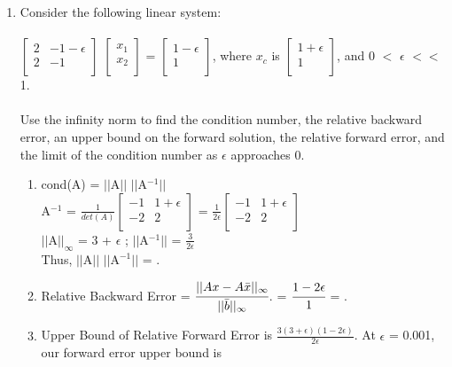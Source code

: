 \documentclass[12pt]{article}
\begin{document}
\begin{enumerate}
\pagebreak
\item Consider the following linear system: \\ \\
$\begin{bmatrix}
    2 & -1-\epsilon\\
   2 & -1 \\
\end{bmatrix}$ $\begin{bmatrix}
   x_1 \\
   x_2 \\
\end{bmatrix}$ = $\begin{bmatrix}
   1-\epsilon \\
   1 \\
\end{bmatrix}$, where $x_c$ is $\begin{bmatrix}
   1+\epsilon \\
   1 \\
\end{bmatrix}$, and 0 $<$ $\epsilon$ $<<$ 1. \\ \\
Use the infinity norm to find the condition number, the relative backward error, an upper bound on the forward solution, the relative forward error, and the limit of the condition number as $\epsilon$ approaches 0.
	\begin{enumerate}
		\item cond(A) = $||$A$||$ $||$A$^{-1}||$ \\
		A$^{-1}$ = $\frac{1}{det(A)} \begin{bmatrix}
    -1 & 1+\epsilon\\
   -2 & 2 \\
\end{bmatrix}$ =  $\frac{1}{2\epsilon} \begin{bmatrix}
    -1 & 1+\epsilon\\
   -2 & 2 \\
\end{bmatrix}$ \\
$||$A$||_{\infty}$ = 3 + $\epsilon$ ; $||$A$^{-1}||$ = $\frac{3}{2\epsilon}$ \\
Thus, $||$A$||$ $||$A$^{-1}||$ = .
\item Relative Backward Error = $\cfrac{||Ax - A\bar{x}||_{\infty}}{||\bar{b}||_{\infty}}$. = $\cfrac{1-2\epsilon}{1}$ = .
\item Upper Bound of Relative Forward Error is $\frac{3(3+\epsilon)(1-2\epsilon)}{2\epsilon}$. At $\epsilon$ = 0.001, our forward error upper bound is 

\end{enumerate}
\end{enumerate}
\end{document}
